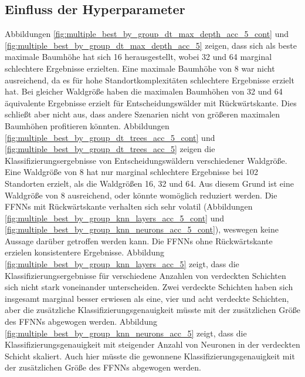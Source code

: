 \subsection{Einfluss der Hyperparameter}
Abbildungen \ref{fig:multiple_best_by_group_dt_max_depth_acc_5_cont} und \ref{fig:multiple_best_by_group_dt_max_depth_acc_5} zeigen, dass sich
als beste maximale Baumhöhe hat sich 16 herausgestellt, wobei 32 und 64 marginal schlechtere Ergebnisse erzielten.
Eine maximale Baumhöhe von 8 war nicht ausreichend, da es für hohe Standortkomplexitäten schlechtere Ergebnisse erzielt hat.
Bei gleicher Waldgröße haben die maximalen Baumhöhen von 32 und 64 äquivalente Ergebnisse erzielt für Entscheidungswälder mit Rückwärtskante.
\newline
\newline
Dies schließt aber nicht aus, dass andere Szenarien nicht von größeren maximalen Baumhöhen profitieren könnten.
Abbildungen \ref{fig:multiple_best_by_group_dt_trees_acc_5_cont} und \ref{fig:multiple_best_by_group_dt_trees_acc_5} zeigen
die Klassifizierungsergebnisse von Entscheidungswäldern verschiedener Waldgröße.
Eine Waldgröße von 8 hat nur marginal schlechtere Ergebnisse bei 102 Standorten erzielt, als die Waldgrößen 16, 32 und 64.
Aus diesem Grund ist eine Waldgröße von 8 ausreichend, oder könnte womöglich reduziert werden.
\newline
\newline
Die FFNNs mit Rückwärtskante verhalten sich sehr volatil (Abbildungen \ref{fig:multiple_best_by_group_knn_layers_acc_5_cont}
und \ref{fig:multiple_best_by_group_knn_neurons_acc_5_cont}), weswegen keine Aussage darüber getroffen werden kann.
Die FFNNs ohne Rückwärtskante erzielen konsistentere Ergebnisse.
Abbildung \ref{fig:multiple_best_by_group_knn_layers_acc_5} zeigt, dass die Klassifizierungsergebnisse
für verschiedene Anzahlen von verdeckten Schichten sich nicht stark voneinander unterscheiden.
Zwei verdeckte Schichten haben sich insgesamt marginal besser erwiesen als eine, vier und acht verdeckte Schichten,
aber die zusätzliche Klassifizierungsgenauigkeit müsste mit der zusätzlichen Größe des FFNNs abgewogen werden.
Abbildung \ref{fig:multiple_best_by_group_knn_neurons_acc_5} zeigt, dass die Klassifizierungsgenauigkeit
mit steigender Anzahl von Neuronen in der verdeckten Schicht skaliert.
Auch hier müsste die gewonnene Klassifizierungsgenauigkeit mit der zusätzlichen Größe des FFNNs abgewogen werden.
